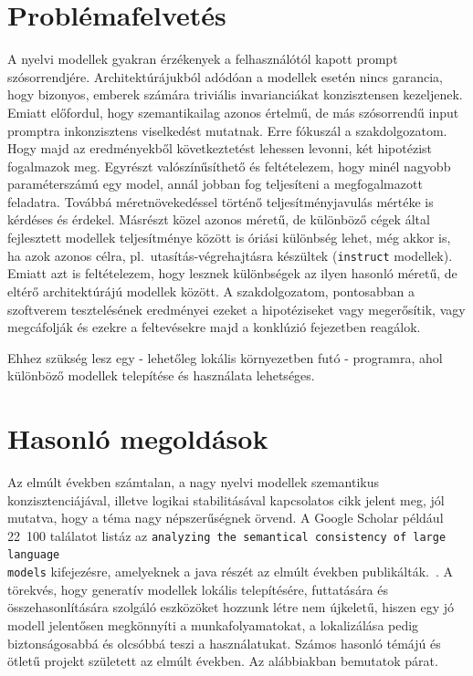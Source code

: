 \documentclass[12pt]{report}
\begin{document}
    \section{Problémafelvetés}
    A nyelvi modellek gyakran érzékenyek a felhasználótól kapott prompt szósorrendjére. Architektúrájukból adódóan a modellek esetén nincs garancia, hogy bizonyos, emberek számára triviális invarianciákat konzisztensen kezeljenek. Emiatt előfordul, hogy szemantikailag azonos értelmű, de más szósorrendű input promptra inkonzisztens viselkedést mutatnak. Erre fókuszál a szakdolgozatom.
    Hogy majd az eredményekből következtetést lehessen levonni, két hipotézist fogalmazok meg.
    Egyrészt valószínűsíthető és feltételezem, hogy minél nagyobb paraméterszámú egy model, annál jobban fog teljesíteni a megfogalmazott feladatra.
    Továbbá méretnövekedéssel történő teljesítményjavulás mértéke is kérdéses és érdekel.
    Másrészt közel azonos méretű, de különböző cégek által fejlesztett modellek teljesítménye között is óriási különbség lehet, még akkor is, ha azok azonos célra, pl.\ utasítás-végrehajtásra készültek (\texttt{\allowbreak instruct} modellek).
    Emiatt azt is feltételezem, hogy lesznek különbségek az ilyen hasonló méretű, de eltérő architektúrájú modellek között.
    A szakdolgozatom, pontosabban a szoftverem tesztelésének eredményei ezeket a hipotéziseket vagy megerősítik, vagy megcáfolják és ezekre a feltevésekre majd a konklúzió fejezetben reagálok.

    Ehhez szükség lesz egy - lehetőleg lokális környezetben futó - programra, ahol különböző modellek telepítése és használata lehetséges.

    \section{Hasonló megoldások}
    Az elmúlt években számtalan, a nagy nyelvi modellek szemantikus konzisztenciájával, illetve logikai stabilitásával kapcsolatos cikk jelent meg, jól mutatva, hogy a téma nagy népszerűségnek örvend.%
    A Google Scholar például 22~100 találatot listáz az \texttt{\allowbreak analyzing the semantical consistency of large language\\ models} kifejezésre, amelyeknek a java részét az elmúlt években publikálták.~\cite{yang-etal-2024-enhancing}.
    A törekvés, hogy generatív modellek lokális telepítésére, futtatására és összehasonlítására szolgáló eszközöket hozzunk létre nem újkeletű, hiszen egy jó modell jelentősen megkönnyíti a munkafolyamatokat, a lokalizálása pedig biztonságosabbá és olcsóbbá teszi a használatukat.
    Számos hasonló témájú és ötletű projekt született az elmúlt években.
    Az alábbiakban bemutatok párat. %
\end{document}
